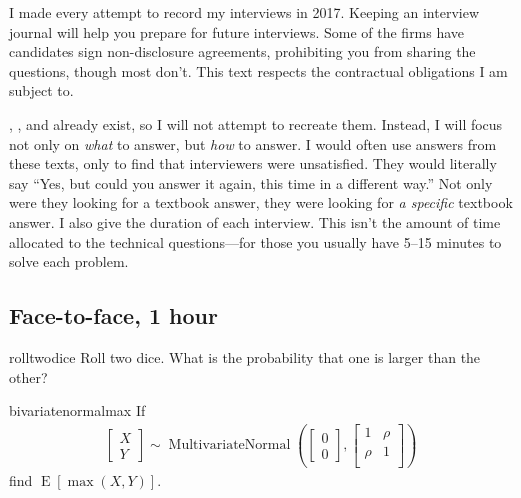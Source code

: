 \documentclass[a4paper]{article}
\begin{document}
I made every attempt to record my interviews in 2017.
Keeping an interview journal will help you prepare for future interviews.
Some of the firms have candidates sign non-disclosure agreements, prohibiting you from sharing the questions, though most don't.
This text respects the contractual obligations I am subject to.

\citet{HeardOnTheStreet},
\citet{JoshiQA}, and
\citet{WilmottFAQ} already exist, so I will not attempt to recreate them.
Instead, I will focus not only on \emph{what} to answer, but \emph{how} to answer.
I would often use answers from these texts, only to find that interviewers were unsatisfied.
They would literally say ``Yes, but could you answer it again, this time in a different way.''
Not only were they looking for a textbook answer, they were looking for \emph{a specific} textbook answer.
I also give the duration of each interview.
This isn't the amount of time allocated to the technical questions---for those you usually have  5--15 minutes to solve each problem.

\subsection{Face-to-face, 1 hour}

\begin{question}{rolltwodice}
Roll two dice. What is the probability that one is larger than the other?
\end{question}

\begin{question}{bivariatenormalmax}
If
\begin{align*}
  \begin{bmatrix}
  X \\ Y
  \end{bmatrix}
  \sim
  \operatorname{MultivariateNormal}
  \left(
  \begin{bmatrix}
  0 \\ 0
  \end{bmatrix}
  ,
  \begin{bmatrix}
  1      &   \rho \\
  \rho   &   1    \\
  \end{bmatrix}
  \right)
\end{align*}
find $\operatorname{E}[\max(X,Y)]$.
\end{question}
\end{document}
